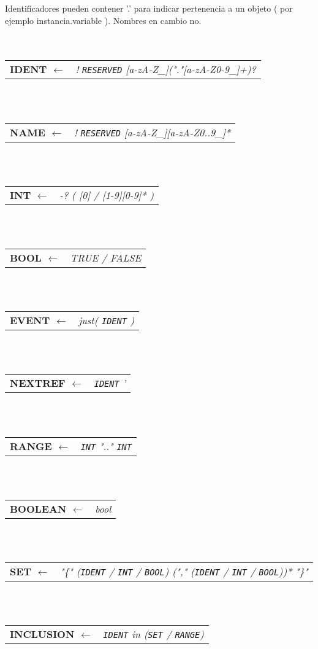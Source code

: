 \documentclass[titlepage, 12pt]{book}
\begin{document}
Identificadores pueden contener '.' para indicar pertenencia a un objeto ( por ejemplo instancia.variable ). Nombres en cambio no.\\
~\\\\
\begin{tabular}{>{\bfseries}l>{\itshape}l}
IDENT $\longleftarrow$ & ! \verb|RESERVED| [a-zA-Z\_]("."[a-zA-Z0-9\_]+)?
\end{tabular}
~\\\\
\begin{tabular}{>{\bfseries}l>{\itshape}l}
NAME $\longleftarrow$ & ! \verb|RESERVED| [a-zA-Z\_][a-zA-Z0..9\_]*
\end{tabular}
~\\\\
\begin{tabular}{>{\bfseries}l>{\itshape}l}
INT $\longleftarrow$ & -? ( [0] / [1-9][0-9]* )
\end{tabular}
~\\\\
\begin{tabular}{>{\bfseries}l>{\itshape}l}
BOOL $\longleftarrow$ & TRUE / FALSE
\end{tabular}
~\\\\
\begin{tabular}{>{\bfseries}l>{\itshape}l}
EVENT $\longleftarrow$ & just( \verb|IDENT| )
\end{tabular}
~\\\\
\begin{tabular}{>{\bfseries}l>{\itshape}l}
NEXTREF $\longleftarrow$ & \verb|IDENT| '
\end{tabular}
~\\\\
\begin{tabular}{>{\bfseries}l>{\itshape}l}
RANGE $\longleftarrow$ & \verb|INT| ".." \verb|INT|
\end{tabular}
~\\\\
\begin{tabular}{>{\bfseries}ll}
BOOLEAN $\longleftarrow$ & \textit{bool}
\end{tabular}
~\\\\
\begin{tabular}{>{\bfseries}l>{\itshape}l}
SET $\longleftarrow$ & "\{" (\verb|IDENT| / \verb|INT| / \verb|BOOL|) ("," (\verb|IDENT| / \verb|INT| / \verb|BOOL|))* "\}"
\end{tabular}
~\\\\
\begin{tabular}{>{\bfseries}l>{\itshape}l}
INCLUSION $\longleftarrow$ & \verb|IDENT| in (\verb|SET| / \verb|RANGE|)
\end{tabular}
~\\\\\\
\end{document}
